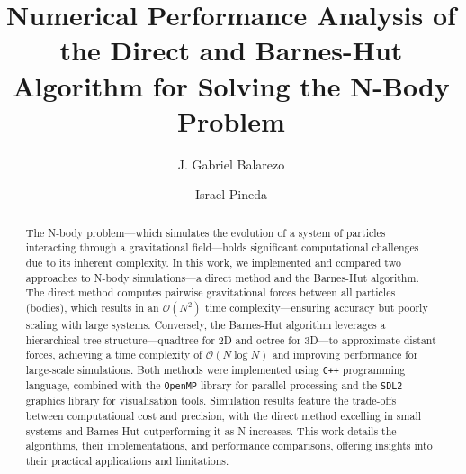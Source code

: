 \documentclass[runningheads]{llncs}
\begin{document}
%
\title{Numerical Performance Analysis of the Direct and Barnes-Hut Algorithm for Solving the N-Body Problem}
%
%

\author{J. Gabriel Balarezo \and
Israel Pineda}
%
%
%
\maketitle              %
%
\begin{abstract}
  The N-body problem---which simulates the evolution of a system of particles interacting through a gravitational field---holds significant computational challenges due to its inherent complexity. In this work, we implemented and compared two approaches to N-body simulations---a direct method and the Barnes-Hut algorithm. The direct method computes pairwise gravitational forces between all particles (bodies), which results in an $\mathcal{O}(N^2)$ time complexity---ensuring accuracy but poorly scaling with large systems. Conversely, the Barnes-Hut algorithm leverages a hierarchical tree structure---quadtree for 2D and octree for 3D---to approximate distant forces, achieving a time complexity of $\mathcal{O}(N\log N)$ and improving performance for large-scale simulations. Both methods were implemented using \texttt{C++} programming language, combined with the \texttt{OpenMP} library for parallel processing and the \texttt{SDL2} graphics library for visualisation tools. Simulation results feature the trade-offs between computational cost and precision, with the direct method excelling in small systems and Barnes-Hut outperforming it as N increases. This work details the algorithms, their implementations, and performance comparisons, offering insights into their practical applications and limitations.

\end{abstract}
%
%
\end{document}
